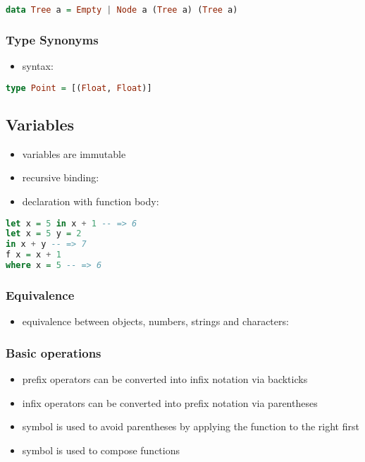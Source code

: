 \documentclass[a4paper,landscape,10pt]{article}
\begin{document}
\begin{multicols*}{2}
  \begin{lstlisting}[language=Haskell]
data Tree a = Empty | Node a (Tree a) (Tree a)
\end{lstlisting}

  \subsubsection{Type Synonyms}

  \begin{itemize}
    \item syntax: 
  \end{itemize}

  \begin{lstlisting}[language=Haskell]
type Point = [(Float, Float)]
\end{lstlisting}

  \subsection{Variables}

  \begin{itemize}
    \item variables are immutable
    \item recursive binding: 
    \item declaration with function body: 
  \end{itemize}

  \begin{lstlisting}[language=Haskell]
let x = 5 in x + 1 -- => 6
let x = 5 y = 2
in x + y -- => 7
f x = x + 1
where x = 5 -- => 6
\end{lstlisting}

  \subsubsection{Equivalence}

  \begin{itemize}
    \item equivalence between objects, numbers, strings and characters: \ihaskell{==}
  \end{itemize}

  \subsubsection{Basic operations}

  \begin{itemize}
    \item prefix operators can be converted into infix notation via backticks 
    \item infix operators can be converted into prefix notation via parentheses 
    \item symbol \ihaskell{\$} is used to avoid parentheses by applying the function to the right first
    \item symbol  is used to compose functions
  \end{itemize}


\end{multicols*}
\end{document}
